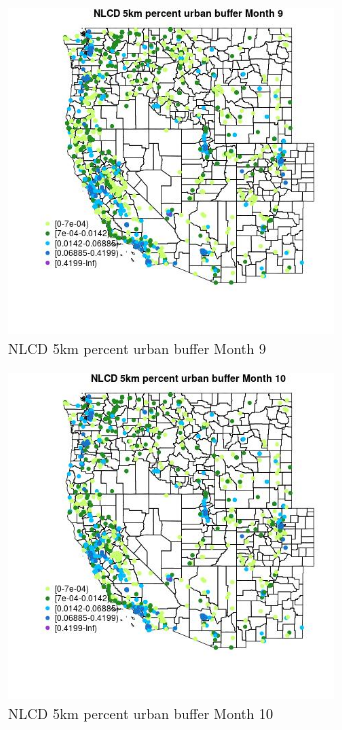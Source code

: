 \begin{figure} 
\centering  
\includegraphics[width=0.77\textwidth]{Code_Outputs/Report_ML_input_PM25_Step4_part_f_de_duplicated_aves_prioritize_24hr_obswNAs_MapObsMo9NLCD_5km_percent_urban_buffer.jpg} 
\caption{\label{fig:Report_ML_input_PM25_Step4_part_f_de_duplicated_aves_prioritize_24hr_obswNAsMapObsMo9NLCD_5km_percent_urban_buffer}NLCD 5km percent urban buffer Month 9} 
\end{figure} 
 

\begin{figure} 
\centering  
\includegraphics[width=0.77\textwidth]{Code_Outputs/Report_ML_input_PM25_Step4_part_f_de_duplicated_aves_prioritize_24hr_obswNAs_MapObsMo10NLCD_5km_percent_urban_buffer.jpg} 
\caption{\label{fig:Report_ML_input_PM25_Step4_part_f_de_duplicated_aves_prioritize_24hr_obswNAsMapObsMo10NLCD_5km_percent_urban_buffer}NLCD 5km percent urban buffer Month 10} 
\end{figure} 
 

